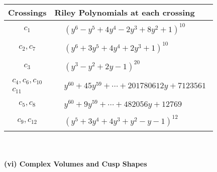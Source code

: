 \documentclass[1p]{elsarticle_modified}
\theoremstyle{definition}
\begin{document}
\begin{tabular}{m{50pt}|m{274pt}}
Crossings & \hspace{64pt}Riley Polynomials at each crossing \\
\hline $$\begin{aligned}c_{1}\end{aligned}$$&$\begin{aligned}
&(y^6- y^5+4 y^4-2 y^3+8 y^2+1)^{10}
\end{aligned}$\\
\hline $$\begin{aligned}c_{2},c_{7}\end{aligned}$$&$\begin{aligned}
&(y^6+3 y^5+4 y^4+2 y^3+1)^{10}
\end{aligned}$\\
\hline $$\begin{aligned}c_{3}\end{aligned}$$&$\begin{aligned}
&(y^3- y^2+2 y-1)^{20}
\end{aligned}$\\
\hline $$\begin{aligned}c_{4},c_{6},c_{10}\\c_{11}\end{aligned}$$&$\begin{aligned}
&y^{60}+45 y^{59}+\cdots+201780612 y+7123561
\end{aligned}$\\
\hline $$\begin{aligned}c_{5},c_{8}\end{aligned}$$&$\begin{aligned}
&y^{60}+9 y^{59}+\cdots+482056 y+12769
\end{aligned}$\\
\hline $$\begin{aligned}c_{9},c_{12}\end{aligned}$$&$\begin{aligned}
&(y^5+3 y^4+4 y^3+y^2- y-1)^{12}
\end{aligned}$\\
\hline
\end{tabular}\\~\\
\newpage\flushleft \textbf{(vi) Complex Volumes and Cusp Shapes}
\end{document}
